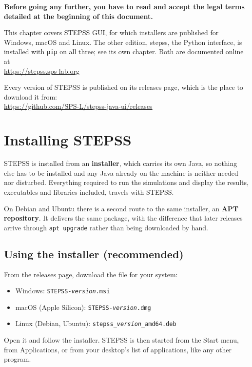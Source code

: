 {\bf \large Before going any further, you have to read and accept the legal terms detailed at the beginning of this document.}

This chapter covers STEPSS GUI, for which installers are published for Windows, macOS and Linux. The other edition, stepss, the Python interface, is installed with {\tt pip} on all three; see its own chapter. Both are documented online at\\
\hspace*{5ex}\url{https://stepss.sps-lab.org}

Every version of STEPSS is published on its releases page, which is the place to download it from:\\
\hspace*{5ex}\url{https://github.com/SPS-L/stepss-java-ui/releases}

\section{Installing STEPSS}

STEPSS is installed from an {\bf installer}, which carries its own Java, so nothing else has to be installed and any Java already on the machine is neither needed nor disturbed. Everything required to run the simulations and display the results, executables and libraries included, travels with STEPSS.

On Debian and Ubuntu there is a second route to the same installer, an {\bf APT repository}. It delivers the same package, with the difference that later releases arrive through {\tt apt upgrade} rather than being downloaded by hand.

\subsection{Using the installer (recommended)}

From the releases page, download the file for your system:
\begin{itemize}
\item Windows: {\tt STEPSS-\emph{version}.msi}
\item macOS (Apple Silicon): {\tt STEPSS-\emph{version}.dmg}
\item Linux (Debian, Ubuntu): {\tt stepss\_\emph{version}\_amd64.deb}
\end{itemize}

Open it and follow the installer. STEPSS is then started from the Start menu, from Applications, or from your desktop's list of applications, like any other program.

